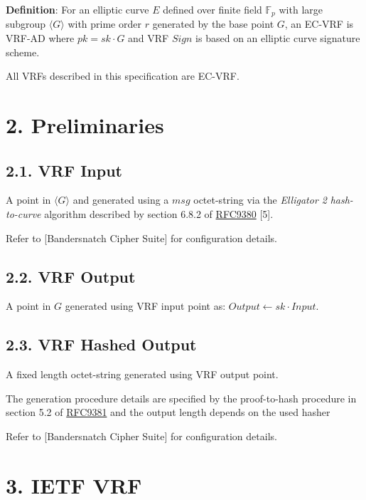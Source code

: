 \documentclass[
]{article}
\begin{document}
\textbf{Definition}: For an elliptic curve \(E\) defined over finite
field \(\mathbb{F}_p\) with large subgroup \(\langle G \rangle\) with
prime order \(r\) generated by the base point \(G\), an EC-VRF is VRF-AD
where \(pk = sk \cdot G\) and VRF \(Sign\) is based on an elliptic curve
signature scheme.

All VRFs described in this specification are EC-VRF.

\hypertarget{preliminaries}{%
\section{2. Preliminaries}\label{preliminaries}}

\hypertarget{vrf-input}{%
\subsection{2.1. VRF Input}\label{vrf-input}}

A point in \(\langle G \rangle\) and generated using a \(msg\)
octet-string via the \emph{Elligator 2} \emph{hash-to-curve} algorithm
described by section 6.8.2 of
\href{https://datatracker.ietf.org/doc/rfc9380}{RFC9380} {[}5{]}.

Refer to {[}Bandersnatch Cipher Suite{]} for configuration details.

\hypertarget{vrf-output}{%
\subsection{2.2. VRF Output}\label{vrf-output}}

A point in \(G\) generated using VRF input point as:
\(Output \leftarrow sk \cdot Input\).

\hypertarget{vrf-hashed-output}{%
\subsection{2.3. VRF Hashed Output}\label{vrf-hashed-output}}

A fixed length octet-string generated using VRF output point.

The generation procedure details are specified by the proof-to-hash
procedure in section 5.2 of
\href{https://datatracker.ietf.org/doc/rfc9381}{RFC9381} and the output
length depends on the used hasher

Refer to {[}Bandersnatch Cipher Suite{]} for configuration details.

\hypertarget{ietf-vrf}{%
\section{3. IETF VRF}\label{ietf-vrf}}
\end{document}
